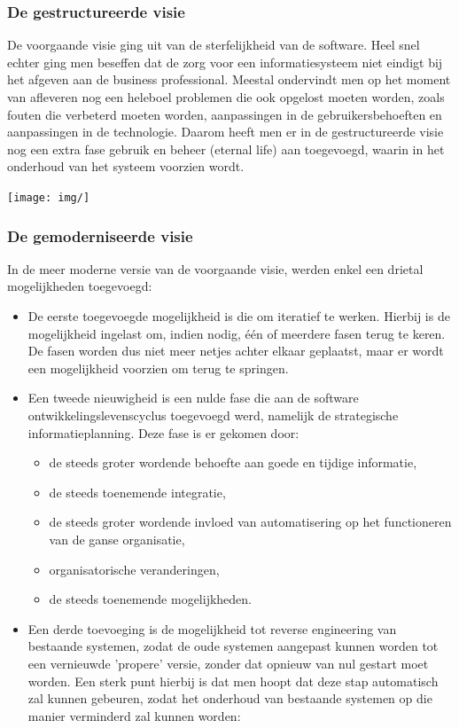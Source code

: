 \subsubsection{De gestructureerde visie}

De voorgaande visie ging uit van de sterfelijkheid van de software. Heel snel echter ging men beseffen dat de zorg voor een informatiesysteem niet eindigt bij het afgeven aan de business professional. Meestal ondervindt men op het moment van afleveren nog een heleboel problemen die ook opgelost moeten worden, zoals fouten die verbeterd moeten worden, aanpassingen in de gebruikersbehoeften en aanpassingen in de technologie. Daarom heeft men er in de gestructureerde visie nog een extra fase gebruik en beheer (eternal life) aan toegevoegd, waarin in het onderhoud van het systeem voorzien wordt.


\begin{center}
\texttt{[image: img/]}%
\label{labelname}%
\end{center}

\subsubsection{De gemoderniseerde visie}

In de meer moderne versie van de voorgaande visie, werden enkel een drietal mogelijkheden toegevoegd:

\begin{itemize}
    \item De eerste toegevoegde mogelijkheid is die om iteratief te werken. Hierbij is de mogelijkheid ingelast om, indien nodig, één of meerdere fasen terug te keren. De fasen worden dus niet meer netjes achter elkaar geplaatst, maar er wordt een mogelijkheid voorzien om terug te springen.
    \item Een tweede nieuwigheid is een nulde fase die aan de software ontwikkelingslevenscyclus toegevoegd werd, namelijk de strategische informatieplanning. Deze fase is er gekomen door:
        \begin{itemize}
        \item de steeds groter wordende behoefte aan goede en tijdige informatie,
        \item de steeds toenemende integratie,
        \item de steeds groter wordende invloed van automatisering op het functioneren van de ganse organisatie,
        \item organisatorische veranderingen,
        \item de steeds toenemende mogelijkheden.
        \end{itemize}
    \item Een derde toevoeging is de mogelijkheid tot reverse engineering van bestaande systemen, zodat de oude systemen aangepast kunnen worden tot een vernieuwde 'propere' versie, zonder dat opnieuw van nul gestart moet worden. Een sterk punt hierbij is dat men hoopt dat deze stap automatisch zal kunnen gebeuren, zodat het onderhoud van bestaande systemen op die manier verminderd zal kunnen worden:
\end{itemize}


